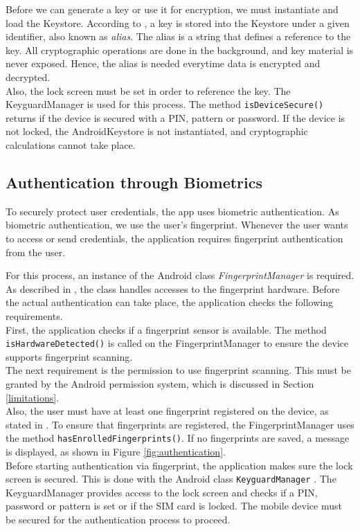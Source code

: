 Before we can generate a key or use it for encryption, we must instantiate and load the Keystore. According to \cite{CooijmansRP14}, a key is stored into the Keystore under a given identifier, also known as \textit{alias}. The alias is a string that defines a reference to the key. All cryptographic operations are done in the background, and key material is never exposed. Hence, the alias is needed everytime data is encrypted and decrypted. \\
Also, the lock screen must be set in order to reference the key. The KeyguardManager is used for this process. The method \texttt{isDeviceSecure()} returns if the device is secured with a PIN, pattern or password. If the device is not locked, the AndroidKeystore is not instantiated, and cryptographic calculations cannot take place. \\




\subsection{Authentication through Biometrics} \label{arch_authenticate}
To securely protect user credentials, the app uses biometric authentication. As biometric authentication, we use the user's fingerprint. Whenever the user wants to access or send credentials, the application requires fingerprint authentication from the user.

For this process, an instance of the Android class \textit{FingerprintManager} is required. As described in \cite{FingerprintManager}, the class handles accesses to the fingerprint hardware. Before the actual authentication can take place, the application checks the following requirements. \\
First, the application checks if a fingerprint sensor is available. The method \texttt{isHardwareDetected()} is called on the FingerprintManager to ensure the device supports fingerprint scanning. \\
The next requirement is the permission to use fingerprint scanning. This must be granted by the Android permission system, which is discussed in Section \ref{limitations}. \\
Also, the user must have at least one fingerprint registered on the device, as stated in \cite{FingerprintTutorial}. To ensure that fingerprints are registered, the FingerprintManager uses the method \texttt{hasEnrolledFingerprints()}. If no fingerprints are saved, a message is displayed, as shown in Figure \ref{fig:authentication}\protect{}. \\
Before starting authentication via fingerprint, the application makes sure the lock screen is secured. This is done with the Android class \texttt{KeyguardManager} \cite{KeyguardManager}. The KeyguardManager provides access to the lock screen and checks if a PIN, password or pattern is set or if the SIM card is locked. The mobile device must be secured for the authentication process to proceed.

